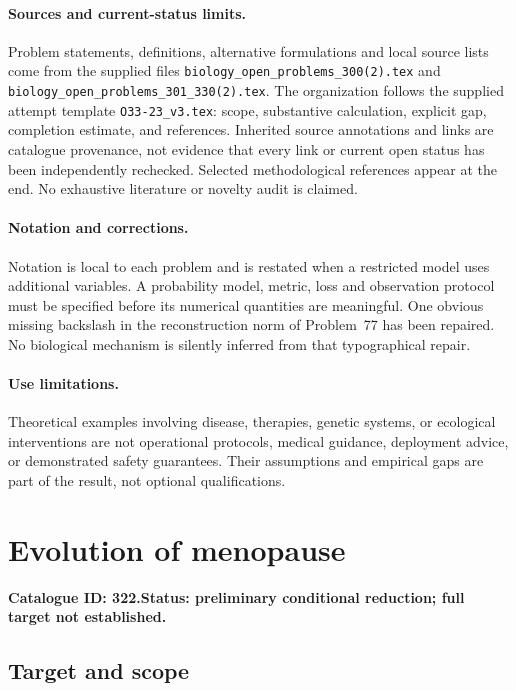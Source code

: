 \documentclass[11pt]{article}
\begin{document}
\paragraph{Sources and current-status limits.}
Problem statements, definitions, alternative formulations and local source lists
come from the supplied files
\texttt{biology\_open\_problems\_300(2).tex} and
\texttt{biology\_open\_problems\_301\_330(2).tex}.
The organization follows the supplied attempt template
\texttt{O33-23\_v3.tex}: scope, substantive calculation, explicit gap,
completion estimate, and references. Inherited source annotations and links are
catalogue provenance, not evidence that every link or current open status has
been independently rechecked. Selected methodological references appear at the
end. No exhaustive literature or novelty audit is claimed.

\paragraph{Notation and corrections.}
Notation is local to each problem and is restated when a restricted model uses
additional variables. A probability model, metric, loss and observation protocol
must be specified before its numerical quantities are meaningful. One obvious
missing backslash in the reconstruction norm of Problem~77 has been repaired.
No biological mechanism is silently inferred from that typographical repair.

\paragraph{Use limitations.}
Theoretical examples involving disease, therapies, genetic systems, or ecological
interventions are not operational protocols, medical guidance, deployment advice,
or demonstrated safety guarantees. Their assumptions and empirical gaps are part
of the result, not optional qualifications.

\setcounter{section}{321}
\section{Evolution of menopause}
\label{prob:322}
\noindent\textbf{Catalogue ID: 322.}\quad \textbf{Status: preliminary conditional reduction; full target not established.}
\subsection{Target and scope}
\end{document}
